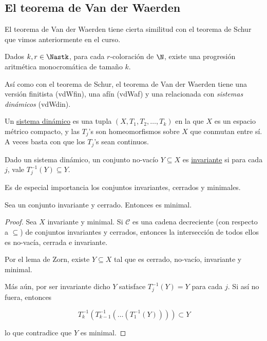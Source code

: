 \subsection{El teorema de Van der Waerden}

El teorema de Van der Waerden tiene cierta similitud con el teorema de Schur que vimos anteriormente en el curso.

\begin{teo}
    Dados $k, r \in \Nastk$, para cada $r$-coloración de $\N$, existe una progresión aritmética monocromática de tamaño $k$.
\end{teo}

Así como con el teorema de Schur, el teorema de Van der Waerden tiene una versión finitista (vdWfin), una afín (vdWaf) y una relacionada con \textit{sistemas dinámicos} (vdWdin).

\begin{defn}
    Un \ul{sistema dinámico} es una tupla $(X, T_1, T_2, \dots, T_k)$ en la que $X$ es un espacio métrico compacto, y las $T_j$'s son homeomorfismos sobre $X$ que conmutan entre sí. A veces basta con que los $T_j$'s sean continuos.
\end{defn}

\begin{defn}
    Dado un sistema dinámico, un conjunto no-vacío $Y \subseteq X$ es \ul{invariante} si para cada $j$, vale $T_j^{-1}(Y) \subseteq Y$.
    
    Es de especial importancia los conjuntos invariantes, cerrados y minimales.
\end{defn}

\begin{teo}
    Sea un conjunto invariante y cerrado. Entonces es minimal.
\end{teo}

\begin{proof}
    Sea $X$ invariante y minimal. Si $\mathcal{C}$ es una cadena decreciente (con respecto a $\subseteq$) de conjuntos invariantes y cerrados, entonces la intersección de todos ellos es no-vacía, cerrada e invariante.
    
    Por el lema de Zorn, existe $Y \subseteq X$ tal que es cerrado, no-vacío, invariante y minimal.
    
    Más aún, por ser invariante dicho $Y$ satisface $T_j^{-1}(Y) = Y$ para cada $j$. Si así no fuera, entonces
    
    \[
    T_k^{-1}( T_{k-1}^{-1} (\dots (T_1^{-1}(Y) ) ) ) \subset Y
    \]
    
    \noindent lo que contradice que $Y$ es minimal.
\end{proof}

